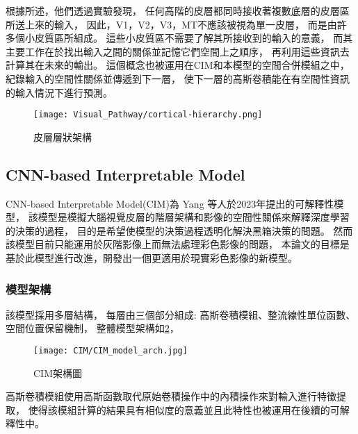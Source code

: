 \documentclass[class=NCU_thesis, crop=false]{standalone}
\begin{document}

\pagebreak
根據\cite{10.5555993636}所述，他們透過實驗發現，
任何高階的皮層都同時接收著複數底層的皮層區所送上來的輸入，
因此，V1，V2，V3，MT不應該被視為單一皮層，
而是由許多個小皮質區所組成。
這些小皮質區不需要了解其所接收到的輸入的意義，
而其主要工作在於找出輸入之間的關係並記憶它們空間上之順序，
再利用這些資訊去計算其在未來的輸出。
這個概念也被運用在CIM和本模型的空間合併模組之中，
紀錄輸入的空間性關係並傳遞到下一層，
使下一層的高斯卷積能在有空間性資訊的輸入情況下進行預測。

\begin{figure}[H]
  \centering
  \texttt{[image: Visual\_Pathway/cortical-hierarchy.png]}
  \caption{皮層層狀架構~\cite{10.5555993636}}
  \label{fig:CorticalHierarchy}
\end{figure}
\pagebreak


\subsection{CNN-based Interpretable Model}
CNN-based Interpretable Model(CIM)\cite{YangCNNInterpretable}為 Yang 等人於2023年提出的可解釋性模型，
該模型是模擬大腦視覺皮層的階層架構和影像的空間性關係來解釋深度學習的決策的過程，
目的是希望使模型的決策過程透明化解決黑箱決策的問題。
然而該模型目前只能運用於灰階影像上而無法處理彩色影像的問題，
本論文的目標是基於此模型進行改進，開發出一個更適用於現實彩色影像的新模型。

\subsubsection{模型架構}
該模型採用多層結構，
每層由三個部分組成: 高斯卷積模組、整流線性單位函數、空間位置保留機制，
整體模型架構如\cref{fig:CIM_arch}，
\begin{figure}[H]
  \centering
  \texttt{[image: CIM/CIM\_model\_arch.jpg]}
  \caption{CIM架構圖~\cite{YangCNNInterpretable}}
  \label{fig:CIM_arch}
\end{figure}


高斯卷積模組使用高斯函數取代原始卷積操作中的內積操作來對輸入進行特徵提取，
使得該模組計算的結果具有相似度的意義並且此特性也被運用在後續的可解釋性中。\\
\end{document}

